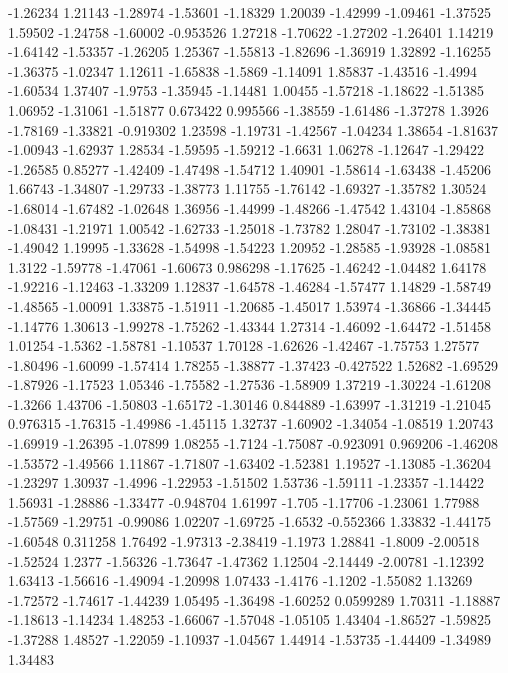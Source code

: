 \documentclass[9pt]{article}
\theoremstyle{plain}
\theoremstyle{definition}
\theoremstyle{remark}
\numberwithin{equation}{section}
\begin{document}
-1.26234
1.21143
-1.28974
-1.53601
-1.18329
1.20039
-1.42999
-1.09461
-1.37525
1.59502
-1.24758
-1.60002
-0.953526
1.27218
-1.70622
-1.27202
-1.26401
1.14219
-1.64142
-1.53357
-1.26205
1.25367
-1.55813
-1.82696
-1.36919
1.32892
-1.16255
-1.36375
-1.02347
1.12611
-1.65838
-1.5869
-1.14091
1.85837
-1.43516
-1.4994
-1.60534
1.37407
-1.9753
-1.35945
-1.14481
1.00455
-1.57218
-1.18622
-1.51385
1.06952
-1.31061
-1.51877
0.673422
0.995566
-1.38559
-1.61486
-1.37278
1.3926
-1.78169
-1.33821
-0.919302
1.23598
-1.19731
-1.42567
-1.04234
1.38654
-1.81637
-1.00943
-1.62937
1.28534
-1.59595
-1.59212
-1.6631
1.06278
-1.12647
-1.29422
-1.26585
0.85277
-1.42409
-1.47498
-1.54712
1.40901
-1.58614
-1.63438
-1.45206
1.66743
-1.34807
-1.29733
-1.38773
1.11755
-1.76142
-1.69327
-1.35782
1.30524
-1.68014
-1.67482
-1.02648
1.36956
-1.44999
-1.48266
-1.47542
1.43104
-1.85868
-1.08431
-1.21971
1.00542
-1.62733
-1.25018
-1.73782
1.28047
-1.73102
-1.38381
-1.49042
1.19995
-1.33628
-1.54998
-1.54223
1.20952
-1.28585
-1.93928
-1.08581
1.3122
-1.59778
-1.47061
-1.60673
0.986298
-1.17625
-1.46242
-1.04482
1.64178
-1.92216
-1.12463
-1.33209
1.12837
-1.64578
-1.46284
-1.57477
1.14829
-1.58749
-1.48565
-1.00091
1.33875
-1.51911
-1.20685
-1.45017
1.53974
-1.36866
-1.34445
-1.14776
1.30613
-1.99278
-1.75262
-1.43344
1.27314
-1.46092
-1.64472
-1.51458
1.01254
-1.5362
-1.58781
-1.10537
1.70128
-1.62626
-1.42467
-1.75753
1.27577
-1.80496
-1.60099
-1.57414
1.78255
-1.38877
-1.37423
-0.427522
1.52682
-1.69529
-1.87926
-1.17523
1.05346
-1.75582
-1.27536
-1.58909
1.37219
-1.30224
-1.61208
-1.3266
1.43706
-1.50803
-1.65172
-1.30146
0.844889
-1.63997
-1.31219
-1.21045
0.976315
-1.76315
-1.49986
-1.45115
1.32737
-1.60902
-1.34054
-1.08519
1.20743
-1.69919
-1.26395
-1.07899
1.08255
-1.7124
-1.75087
-0.923091
0.969206
-1.46208
-1.53572
-1.49566
1.11867
-1.71807
-1.63402
-1.52381
1.19527
-1.13085
-1.36204
-1.23297
1.30937
-1.4996
-1.22953
-1.51502
1.53736
-1.59111
-1.23357
-1.14422
1.56931
-1.28886
-1.33477
-0.948704
1.61997
-1.705
-1.17706
-1.23061
1.77988
-1.57569
-1.29751
-0.99086
1.02207
-1.69725
-1.6532
-0.552366
1.33832
-1.44175
-1.60548
0.311258
1.76492
-1.97313
-2.38419
-1.1973
1.28841
-1.8009
-2.00518
-1.52524
1.2377
-1.56326
-1.73647
-1.47362
1.12504
-2.14449
-2.00781
-1.12392
1.63413
-1.56616
-1.49094
-1.20998
1.07433
-1.4176
-1.1202
-1.55082
1.13269
-1.72572
-1.74617
-1.44239
1.05495
-1.36498
-1.60252
0.0599289
1.70311
-1.18887
-1.18613
-1.14234
1.48253
-1.66067
-1.57048
-1.05105
1.43404
-1.86527
-1.59825
-1.37288
1.48527
-1.22059
-1.10937
-1.04567
1.44914
-1.53735
-1.44409
-1.34989
1.34483
\end{document}
